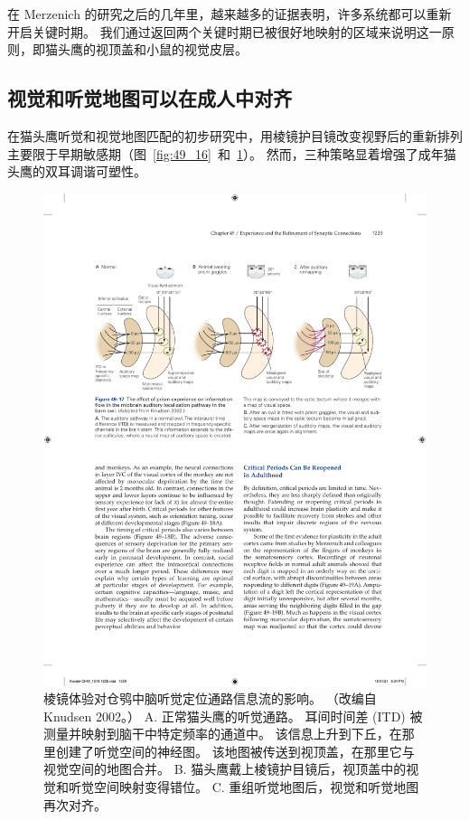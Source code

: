在 Merzenich 的研究之后的几年里，越来越多的证据表明，许多系统都可以重新开启关键时期。
我们通过返回两个关键时期已被很好地映射的区域来说明这一原则，即猫头鹰的视顶盖和小鼠的视觉皮层。



\subsection{视觉和听觉地图可以在成人中对齐}

在猫头鹰听觉和视觉地图匹配的初步研究中，用棱镜护目镜改变视野后的重新排列主要限于早期敏感期（图~\ref{fig:49_16}~和~\ref{fig:49_17}）。
然而，三种策略显着增强了成年猫头鹰的双耳调谐可塑性。


\begin{figure}[htbp]
	\centering
	\includegraphics[width=0.95\linewidth]{chap49/fig_49_17}
	\caption{棱镜体验对仓鸮中脑听觉定位通路信息流的影响。 （改编自 Knudsen 2002。） A. 正常猫头鹰的听觉通路。 耳间时间差 (ITD) 被测量并映射到脑干中特定频率的通道中。 该信息上升到下丘，在那里创建了听觉空间的神经图。 该地图被传送到视顶盖，在那里它与视觉空间的地图合并。 B. 猫头鹰戴上棱镜护目镜后，视顶盖中的视觉和听觉空间映射变得错位。 C. 重组听觉地图后，视觉和听觉地图再次对齐。}
	\label{fig:49_17}
\end{figure}


